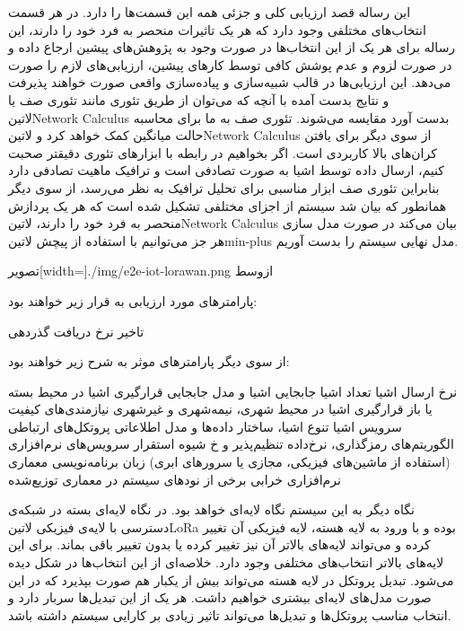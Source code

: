 این رساله قصد ارزیابی کلی و جزئی همه این قسمت‌ها را دارد. در هر قسمت انتخاب‌های مختلفی وجود دارد که هر یک تاثیرات منحصر به فرد خود را دارند،
این رساله برای هر یک از این انتخاب‌ها در صورت وجود به پژوهش‌های پیشین ارجاع داده و در صورت لزوم و عدم پوشش کافی توسط کارهای پیشین، ارزیابی‌های لازم را صورت می‌دهد.
این ارزیابی‌ها در قالب شبیه‌سازی و پیاده‌سازی واقعی صورت خواهند پذیرفت و نتایج بدست آمده با آنچه که می‌توان از طریق تئوری مانند تئوری صف یا ‌لاتین{Network Calculus}
بدست آورد مقایسه می‌شوند. تئوری صف به ما برای محاسبه حالت میانگین کمک خواهد کرد و ‌لاتین{Network Calculus} از سوی دیگر برای یافتن کران‌های بالا کاربردی است.
اگر بخواهیم در رابطه با ابزارهای تئوری دقیقتر صحبت کنیم، ارسال داده توسط اشیا به صورت تصادفی است و ترافیک ماهیت تصادفی دارد بنابراین تئوری صف ابزار مناسبی برای تحلیل ترافیک به نظر می‌رسد،
از سوی دیگر همانطور که بیان شد سیستم از اجزای مختلفی تشکیل شده است که هر یک پردازش منحصر به فرد خود را دارند، ‌لاتین{Network Calculus} بیان می‌کند در صورت مدل سازی هر جز
می‌توانیم با استفاده از پیچش ‌لاتین{min-plus} مدل نهایی سیستم را بدست آوریم.

‌تصویر[width=\textwidth]{./img/e2e-iot-lorawan.png}
‌ازوسط

پارامترهای مورد ارزیابی به قرار زیر خواهند بود:

 تاخیر
 نرخ دریافت
 گذردهی

از سوی دیگر پارامترهای موثر به شرح زیر خواهند بود:

 نرخ ارسال اشیا
 تعداد اشیا
 جابجایی اشیا و مدل جابجایی
 قرارگیری اشیا در محیط بسته یا باز
 قرارگیری اشیا در محیط شهری، نیمه‌شهری و غیرشهری
 نیازمندی‌های کیفیت سرویس اشیا
 تنوع اشیا، ساختار داده‌ها و مدل اطلاعاتی
 پروتکل‌های ارتباطی
 الگوریتم‌های رمزگذاری، نرخ‌داده تنظیم‌پذیر و ‌خ
 شیوه استقرار سرویس‌های نرم‌افزاری (استفاده از ماشین‌های فیزیکی، مجازی یا سرورهای ابری)
 زبان برنامه‌نویسی
 معماری نرم‌افزاری
 خرابی برخی از نودهای سیستم در معماری توزیع‌شده

نگاه دیگر به این سیستم نگاه لایه‌ای خواهد بود. در نگاه لایه‌ای بسته در شبکه‌ی دسترسی با لایه‌ی فیزیکی ‌لاتین{LoRa} بوده و با ورود به لایه هسته،
لایه فیزیکی آن تغییر کرده و می‌تواند لایه‌های بالاتر آن نیز تغییر کرده یا بدون تغییر باقی بماند. برای این لایه‌های بالاتر انتخاب‌های مختلفی وجود دارد.
خلاصه‌ای از این انتخاب‌ها در شکل  دیده می‌شود.
تبدیل پروتکل در لایه هسته می‌تواند بیش از یکبار هم صورت بپذیرد که در این صورت مدل‌های لایه‌ای بیشتری خواهیم داشت. هر یک از این تبدیل‌ها
سربار دارد و انتخاب مناسب پروتکل‌ها و تبدیل‌ها می‌تواند تاثیر زیادی بر کارایی سیستم داشته باشد.

